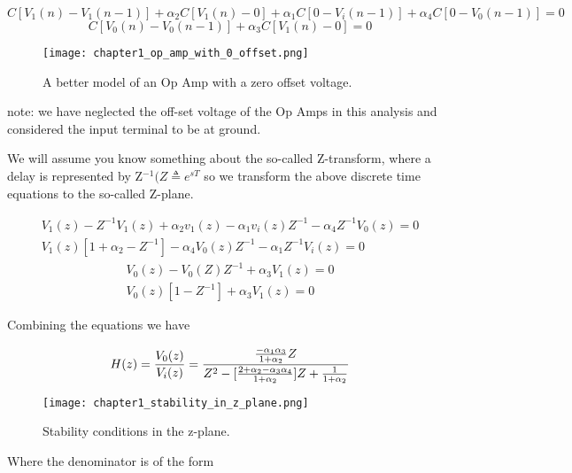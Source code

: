\documentclass[11pt,fleqn]{book} %
\begin{document}
\begin{equation}
C[V_1(n)-V_1(n-1)]+\alpha_2 C[V_1(n)-0]+\alpha_1 C[0-V_i(n-1)]+\alpha_4 C[0-V_0(n-1)]=0 \tag{A}
\end{equation}
\begin{equation}
C[V_0(n)-V_0(n-1)]+\alpha_3 C[V_1(n)-0]=0 \tag{B}
\end{equation}


\begin{wrapfigure}{r}{0.2\textwidth}
  \begin{center}
    \texttt{[image: chapter1\_op\_amp\_with\_0\_offset.png]}
  \end{center}
  \caption{A better model of an Op Amp with a zero offset voltage.}
\end{wrapfigure}

note: we have neglected the off-set voltage of the Op Amps in this analysis and considered the input terminal to be at ground.

We will assume you know something about the so-called Z-transform, where a delay is represented by Z$^{-1} (Z\triangleq e^{sT}$ so we transform the above discrete time equations to the so-called Z-plane.

\begin{equation}
\substack{V_1(z)-Z^{-1}V_1(z)+\alpha_2 v_1(z)-\alpha_1 v_i(z)Z^{-1}-\alpha_4 Z^{-1}V_0(z)=0\\
V_1(z)[1+\alpha_2-Z^{-1}]-\alpha_4V_0(z)Z^{-1}-\alpha_1Z^{-1}V_i(z)=0} \tag{A}
\end{equation}
\begin{equation}
\substack{V_0(z)-V_0(Z)Z^{-1}+\alpha_3V_1(z)=0\\
V_0(z)[1-Z^{-1}]+\alpha_3V_1(z)=0}\tag{B}
\end{equation}

Combining the equations we have

$$H(z)={V_0(z)\over V_i(z)}=\frac{{-\alpha_1\alpha_3\over 1+\alpha_2} Z}{Z^2-[\frac{2+\alpha_2-\alpha_3\alpha_4}{1+\alpha_2}]Z+{1\over 1+\alpha_2}}$$

\begin{wrapfigure}{r}{0.3\textwidth}
  \begin{center}
    \texttt{[image: chapter1\_stability\_in\_z\_plane.png]}
  \end{center}
  \caption{Stability conditions in the z-plane.}
\end{wrapfigure}

Where the denominator is of the form
\end{document}
